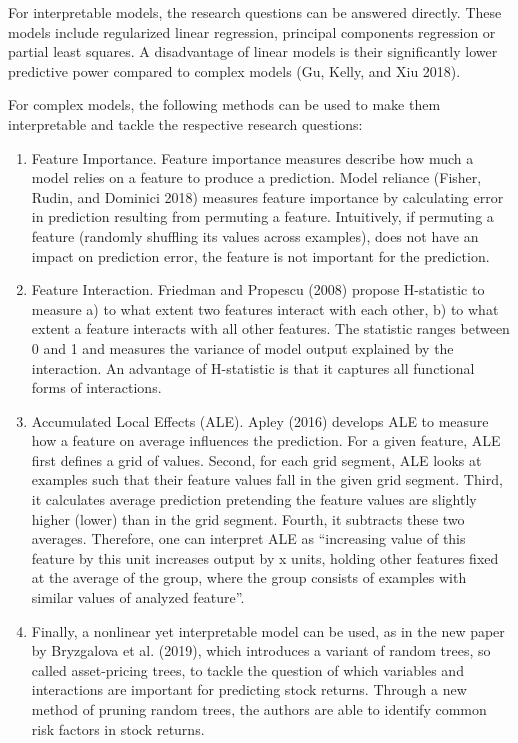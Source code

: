 For interpretable models, the research questions can be answered directly. These models include regularized linear regression, principal components regression or partial least squares. A disadvantage of linear models is their significantly lower predictive power compared to complex models (Gu, Kelly, and Xiu 2018).

For complex models, the following methods can be used to make them interpretable and tackle the respective research questions:

\begin{enumerate}
	\item 	Feature Importance. Feature importance measures describe how much a model relies on a feature to produce a prediction. Model reliance (Fisher, Rudin, and Dominici 2018) measures feature importance by calculating error in prediction resulting from permuting a feature. Intuitively, if permuting a feature (randomly shuffling its values across examples), does not have an impact on prediction error, the feature is not important for the prediction. 
	
	\item Feature Interaction. Friedman and Propescu (2008) propose H-statistic to measure a) to what extent two features interact with each other, b) to what extent a feature interacts with all other features. The statistic ranges between 0 and 1 and measures the variance of model output explained by the interaction. An advantage of H-statistic is that it captures all functional forms of interactions.
	
	\item Accumulated Local Effects (ALE). Apley (2016) develops ALE to measure how a feature on average influences the prediction. For a given feature, ALE first defines a grid of values. Second, for each grid segment, ALE looks at examples such that their feature values fall in the given grid segment. Third, it calculates average prediction pretending the feature values are slightly higher (lower) than in the grid segment. Fourth, it subtracts these two averages. Therefore, one can interpret ALE as “increasing value of this feature by this unit increases output by x units, holding other features fixed at the average of the group, where the group consists of examples with similar values of analyzed feature”.
	
	\item Finally, a nonlinear yet interpretable model can be used, as in the new paper by Bryzgalova et al. (2019), which introduces a variant of random trees, so called asset-pricing trees, to tackle the question of which variables and interactions are important for predicting stock returns. Through a new method of pruning random trees, the authors are able to identify common risk factors in stock returns.
\end{enumerate}

